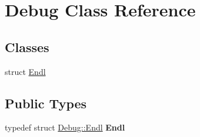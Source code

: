 \hypertarget{class_debug}{\section{Debug Class Reference}
\label{class_debug}
}
\subsection*{Classes}
\begin{DoxyCompactItemize}
\item 
struct \hyperlink{struct_debug_1_1_endl}{Endl}
\end{DoxyCompactItemize}
\subsection*{Public Types}
\begin{DoxyCompactItemize}
\item 
\hypertarget{class_debug_ae8ccdf4f6146b7d5a983189621875daf}{typedef struct \hyperlink{struct_debug_1_1_endl}{Debug\+::\+Endl} {\bfseries Endl}}\label{class_debug_ae8ccdf4f6146b7d5a983189621875daf}

\end{DoxyCompactItemize}
